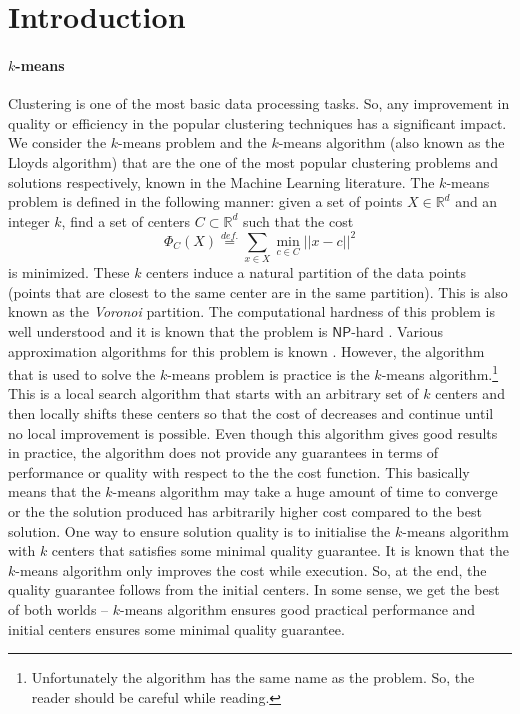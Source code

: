 \section{Introduction}

\paragraph{$k$-means} Clustering is one of the most basic data processing tasks. 
So, any improvement in quality or efficiency in the popular clustering techniques has a significant impact.
We consider the $k$-means problem and the $k$-means algorithm (also known as the Lloyds algorithm) that are the one of the most popular clustering problems and solutions respectively, known in the Machine Learning literature.
The $k$-means problem is defined in the following manner: given a set of points $X \in \mathbb{R}^d$ and an integer $k$, find a set of centers $C \subset \mathbb{R}^d$ such that the cost 
$$\Phi_C(X) \stackrel{def.}{=} \sum_{x \in X} \min_{c \in C} ||x - c||^2$$ 
is minimized.
These $k$ centers induce a natural partition of the data points (points that are closest to the same center are in the same partition).
This is also known as the {\em Voronoi} partition.
The computational hardness of this problem is well understood and it is known that the problem is $\mathsf{NP}$-hard \cite{das08}.
Various approximation algorithms for this problem is known \cite{KanungoMNPSW02,charikar02}. 
However, the algorithm that is used to solve the $k$-means problem is practice is the $k$-means algorithm.\footnote{Unfortunately the algorithm has the same name as the problem. 
So, the reader should be careful while reading.}
This is a local search algorithm that starts with an arbitrary set of $k$ centers and then locally shifts these centers so that the cost of decreases and continue until no local improvement is possible.
Even though this algorithm gives good results in practice, the algorithm does not provide any guarantees in terms of performance or quality with respect to the the cost function.
This basically means that the $k$-means algorithm may take a huge amount of time to converge or the the solution produced has arbitrarily higher cost compared to the best solution. 
One way to ensure solution quality is to initialise the $k$-means algorithm with $k$ centers that satisfies some minimal quality guarantee. 
It is known that the $k$-means algorithm only improves the cost while execution. 
So, at the end, the quality guarantee follows from the initial centers.
In some sense, we get the best of both worlds -- $k$-means algorithm ensures good practical performance and initial centers ensures some minimal quality guarantee.

